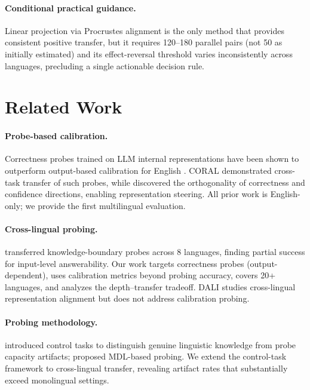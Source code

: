 \documentclass[11pt,a4paper]{article}
\begin{document}
\paragraph{Conditional practical guidance.}
Linear projection via Procrustes alignment is the only method that provides consistent positive transfer, but it requires 120--180 parallel pairs (not 50 as initially estimated) and its effect-reversal threshold varies inconsistently across languages, precluding a single actionable decision rule.

\section{Related Work}
\label{sec:related}

\paragraph{Probe-based calibration.}
Correctness probes trained on LLM internal representations have been shown to outperform output-based calibration for English \cite{}.
CORAL \cite{} demonstrated cross-task transfer of such probes, while \citet{} discovered the orthogonality of correctness and confidence directions, enabling representation steering.
All prior work is English-only; we provide the first multilingual evaluation.

\paragraph{Cross-lingual probing.}
\citet{} transferred knowledge-boundary probes across 8 languages, finding partial success for input-level answerability.
Our work targets correctness probes (output-dependent), uses calibration metrics beyond probing accuracy, covers 20+ languages, and analyzes the depth--transfer tradeoff.
DALI \cite{} studies cross-lingual representation alignment but does not address calibration probing.

\paragraph{Probing methodology.}
\citet{} introduced control tasks to distinguish genuine linguistic knowledge from probe capacity artifacts; \citet{} proposed MDL-based probing.
We extend the control-task framework to cross-lingual transfer, revealing artifact rates that substantially exceed monolingual settings.
\end{document}
